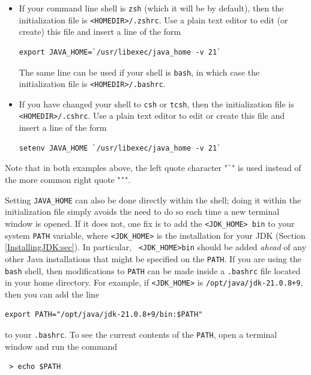 \begin{itemize}

\item If your command line shell is {\tt zsh} (which it will be by
default), then the initialization file is {\tt <HOMEDIR>/.zshrc}. Use a
plain text editor to edit (or create) this file and insert a line of
the form
%
\begin{lstlisting}[]
  export JAVA_HOME=`/usr/libexec/java_home -v 21`
\end{lstlisting}
%
The same line can be used if your shell is {\tt bash}, in which case
the initialization file is {\tt <HOMEDIR>/.bashrc}.

\item If you have changed your shell to {\tt csh} or {\tt tcsh},
then the initialization file is {\tt <HOMEDIR>/.cshrc}. Use a plain text editor
to edit or create this file and insert a line of the form
%
\begin{lstlisting}[]
  setenv JAVA_HOME `/usr/libexec/java_home -v 21`
\end{lstlisting}
%

\end{itemize}

Note that in both examples above, the left quote character "{\tt \`{}}" is used
instead of the more common right quote "{\tt '}".

Setting {\tt JAVA\_HOME} can also be done directly within the shell;
doing it within the initialization file simply avoids the need to do
so each time a new terminal window is opened.
\fi
\ifLinux
If it does not, one fix is to add the \directory{} {\tt <JDK\_HOME>\SEP
bin} to your system {\tt PATH} variable, where {\tt <JDK\_HOME>} is the
installation \directory{} for your JDK (Section \ref{InstallingJDK:sec}).
In particular, {\tt
<JDK\_HOME>\SEP bin} should be added {\it ahead} of any other Java
installations that might be specified on the {\tt PATH}.  If you are
using the {\tt bash} shell, then modifications to {\tt PATH} can be
made inside a {\tt .bashrc} file located in your home directory.
For example, if {\tt <JDK\_HOME>} is {\tt /opt/java/jdk-21.0.8+9},
then you can add the line
\begin{verbatim}
export PATH="/opt/java/jdk-21.0.8+9/bin:$PATH"
\end{verbatim}
to your {\tt .bashrc}. To see the current contents of the {\tt PATH},
open a terminal window and run the command
\begin{verbatim}
 > echo $PATH
\end{verbatim}
\fi


